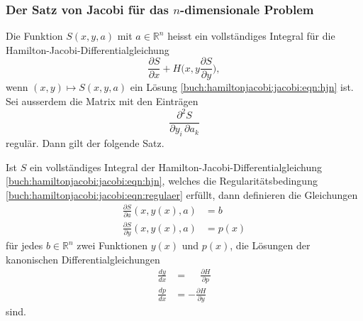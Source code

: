 %
%
\subsubsection{Der Satz von Jacobi für das $n$-dimensionale Problem}
Die Funktion $S(x,y,a)$ mit $a\in\mathbb{R}^n$ heisst ein
vollständiges Integral für die Hamilton-Jacobi-Differentialgleichung
\begin{equation}
\frac{\partial S}{\partial x}
+
H\biggl(x,y
\frac{\partial S}{\partial y}
\biggr),
\label{buch:hamiltonjacobi:jacobi:eqn:hjn}
\end{equation}
wenn $(x,y)\mapsto S(x,y,a)$ ein Lösung 
\eqref{buch:hamiltonjacobi:jacobi:eqn:hjn} ist.
Sei ausserdem die Matrix mit den Einträgen
\begin{equation}
\frac{\partial^2 S}{\partial y_i\,\partial a_k}
\label{buch:hamiltonjacobi:jacobi:eqn:regulaer}
\end{equation}
regulär.
Dann gilt der folgende Satz.

\begin{satz}[Jacobi]
Ist $S$ ein vollständiges Integral der Hamilton-Jacobi-Differentialgleichung
\eqref{buch:hamiltonjacobi:jacobi:eqn:hjn}, welches die Regularitätsbedingung
\eqref{buch:hamiltonjacobi:jacobi:eqn:regulaer} erfüllt,
dann definieren die Gleichungen
\begin{align}
\frac{\partial S}{\partial a}(x,y(x),a) &= b
\label{buch:hamiltonjacobi:jacobi:eqn:implizit1}
\\
\frac{\partial S}{\partial y}(x,y(x),a) &= p(x)
\label{buch:hamiltonjacobi:jacobi:eqn:implizit2}
\end{align}
für jedes $b\in\mathbb{R}^n$ zwei Funktionen $y(x)$ und $p(x)$, die
Lösungen der kanonischen Differentialgleichungen
\begin{align*}
\frac{dy}{dx} &= \phantom{-}\frac{\partial H}{\partial p}
\\
\frac{dp}{dx} &= -\frac{\partial H}{\partial y}
\end{align*}
sind.
\end{satz}

